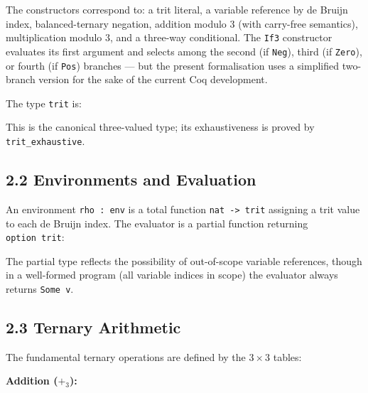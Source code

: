 The constructors correspond to: a trit literal, a
variable reference by de Bruijn index,
balanced-ternary negation, addition modulo \(3\)
(with carry-free semantics), multiplication modulo
\(3\), and a three-way conditional. The
\texttt{If3} constructor evaluates its first
argument and selects among the second (if
\texttt{Neg}), third (if \texttt{Zero}), or fourth
(if \texttt{Pos}) branches --- but the present
formalisation uses a simplified two-branch version
for the sake of the current Coq development.

The type \texttt{trit} is:

\begin{Shaded}
\begin{Highlighting}[]
\end{Highlighting}
\end{Shaded}

This is the canonical three-valued type; its
exhaustiveness is proved by
\texttt{trit\_exhaustive}.

\subsection{2.2 Environments and
Evaluation}\label{fa_27:environments-and-evaluation}

An environment \texttt{rho\ :\ env} is a total
function \texttt{nat\ -\textgreater{}\ trit}
assigning a trit value to each de Bruijn index.
The evaluator is a partial function returning
\texttt{option\ trit}:

\begin{Shaded}
\begin{Highlighting}[]
\end{Highlighting}
\end{Shaded}

The partial type reflects the possibility of
out-of-scope variable references, though in a
well-formed program (all variable indices in
scope) the evaluator always returns
\texttt{Some\ v}.

\subsection{2.3 Ternary
Arithmetic}\label{fa_27:ternary-arithmetic}

The fundamental ternary operations are defined by
the \(3 \times 3\) tables:

\textbf{Addition (\(+_3\)):}

